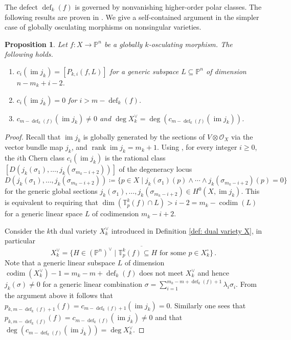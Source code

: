 \documentclass[11pt,reqno]{amsart}
\numberwithin{equation}{section}
\theoremstyle{plain}
\numberwithin{theorem}{section}
\newtheorem{proposition}[theorem]{Proposition}
\theoremstyle{definition}
\renewcommand{\P}{\mathbb{P}}
\newcommand{\T}{\mathbb{T}}
\newcommand{\OO}{\mathcal{O}}
\newcommand{\codim}{\operatorname{codim}}
\newcommand{\defect}{\operatorname{def}}
\newcommand{\rank}{\operatorname{rank}}
\newcommand{\image}{\operatorname{im}}
\begin{document}
The defect $\defect_k(f)$ is governed by nonvanishing higher-order polar classes. 
The following results are proven in \cite[Theorem 3.5]{piene2022higher}. We give a self-contained argument in the simpler case of globally osculating morphisms on nonsingular varieties.
\begin{proposition}{\cite[Theorem 3.5]{piene2022higher}}
\label{prop: compare k-order defect and number of vanishing higher polar degrees}
Let $f\colon X\to\P^n$ be a globally $k$-osculating morphism. The following holds.
\begin{enumerate}
    \item $c_i(\image j_k)=[P_{k,i}(f,L)]$ for a generic subspace $L\subseteq\P^n$ of dimension $n-m_k+i-2$.
    \item $c_i(\image j_k)=0$ for $i>m-\defect_k(f)$.
    \item $c_{m-\defect_k(f)}(\image j_k)\neq 0$ and $\deg X_k^\vee=\deg(c_{m-\defect_k(f)}(\image j_k))$.
\end{enumerate}
\end{proposition}
\begin{proof}
Recall that $\image j_k$ is globally generated by the sections of $V\otimes \OO_X$ via the vector bundle map $j_k$, and $\rank\image j_k=m_k+1$. Using \cite[\S III.3, pp. 411--414]{griffiths1978principles}, for every integer $i\ge 0$, the $i$th Chern class $c_i(\image j_k)$ is the rational class $[D(j_k(\sigma_1),\dots,j_k(\sigma_{m_k-i+2}))]$ of the degeneracy locus
\[
   D(j_k(\sigma_1),\dots,j_k(\sigma_{m_k-i+2})) \coloneqq \{p\in X\mid j_k(\sigma_1)(p)\wedge\cdots\wedge j_k(\sigma_{m_k-i+2})(p)=0\}
\]
for the generic global sections $j_k(\sigma_1),\dots,j_k(\sigma_{m_k-i+2})\in H^0(X,\image j_k).$
This is equivalent to requiring that $\dim(\T_p^k(f)\cap L)>i-2=m_k-\codim(L)$ for a generic linear space $L$ of codimension $m_k-i+2$.

Consider the $k$th dual variety $X_k^\vee$ introduced in Definition \ref{def: dual variety X}, in particular
\[
X_k^\vee=\overline{\{H\in(\P^n)^\vee \mid \text{$\T_p^k(f)\subseteq H$ for some $p\in X_k^{\circ}$}\}}\,.
\]
Note that a generic linear subspace $L$ of dimension $\codim(X_k^\vee)-1=m_k-m+\defect_k(f)$ does not meet $X_k^\vee$ and hence $j_k(\sigma)\neq 0$ for a generic linear combination $\sigma=\sum_{i=1}^{m_k-m+\defect_k(f)+1}\lambda_i\sigma_i.$ 
From the argument above it follows that $p_{k,m-\defect_k(f)+1}(f)=c_{m-\defect_k(f)+1}(\image j_k)=0.$ Similarly one sees that $p_{k,m-\defect_k(f)}(f)=c_{m-\defect_k(f)}(\image j_k)\neq 0$ and that $\deg(c_{m-\defect_k(f)}(\image j_k))=\deg X_k^\vee$.
\end{proof}
\end{document}
